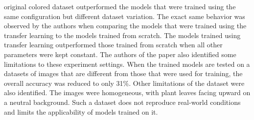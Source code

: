 \documentclass{BachelorBUI}
\begin{document}
original colored dataset outperformed the models that were trained using the same configuration but different dataset variation. The exact same behavior was observed by the authors when comparing the models that were trained using the transfer learning to the models trained from scratch. The models trained using transfer learning outperformed those trained from scratch when all other parameters were kept constant. The authors of the paper also identified some limitations to these experiment settings. When the trained models are tested on a datasets of images that are different from those that were used for training, the overall accuracy was reduced to only 31\%. Other limitations of the dataset were also identified. The images were homogeneous, with plant leaves facing upward on a neutral background. Such a dataset does not reproduce real-world conditions and limits the applicability of models trained on it.
\end{document}
